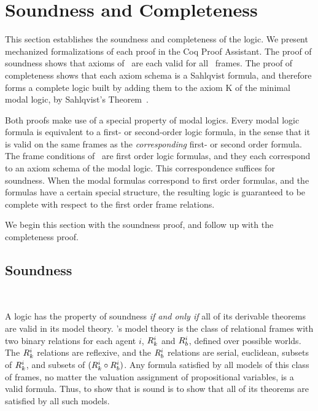 



\section{Soundness and Completeness}

This section establishes the soundness and completeness of the logic.  We present mechanized formalizations of each proof in the Coq Proof Assistant. The proof of soundness shows that axioms of \DASL\ are each valid for all \DASL\ frames. The proof of completeness shows that each axiom schema is a Sahlqvist formula, and therefore forms a complete logic built by adding them to the axiom K of the minimal modal logic, by Sahlqvist's Theorem~\cite{sahlqvist}.

Both proofs make use of a special property of modal logics. Every modal logic formula is equivalent to a first- or second-order logic formula, in the sense that it is valid on the same frames as the \emph{corresponding} first- or second order formula. The frame conditions of \DASL\ are first order logic formulas, and they each correspond to an axiom schema of the modal logic. This correspondence suffices for soundness. When the modal formulas correspond to first order formulas, and the formulas have a certain special structure, the resulting logic is guaranteed to be complete with respect to the first order frame relations.

We begin this section with the soundness proof, and follow up with the completeness proof. 

\subsection{Soundness}~\label{sec:soundness}

A logic has the property of soundness \emph{if and only if} all of its derivable theorems are valid in its model theory. \DASL's model theory is the class of relational frames with two binary relations for each agent $i$, $R_{k}^i$ and $R_{b}^i$, defined over possible worlds. The $R_{k}^i$ relations are reflexive, and the $R_{b}^i$ relations are serial, euclidean, subsets of $R_{k}^i$, and subsets of $(R_{k}^i \circ R_{b}^i)$. Any formula satisfied by all models of this class of frames, no matter the valuation assignment of propositional variables, is a valid formula. Thus, to show that \DASL is sound is to show that all of its theorems are satisfied by all such models.

